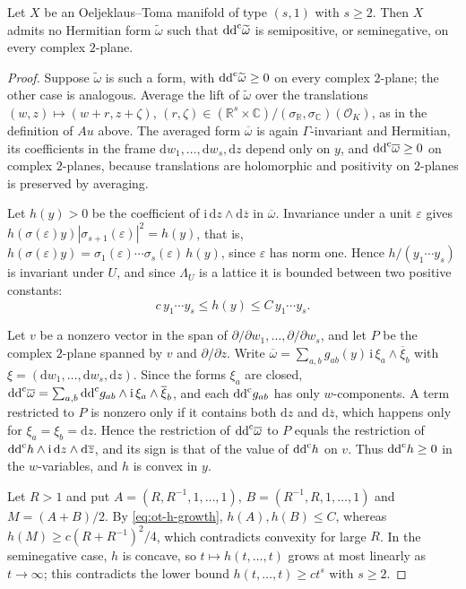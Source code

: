 \begin{proposition}\label{prop:ot-no-plurisigned}
Let $X$ be an Oeljeklaus--Toma manifold of type $(s,1)$ with $s\geq2$. Then $X$ admits no Hermitian form $\widetilde\omega$ such that $\mathrm{dd}^{\mathrm{c}}\widetilde\omega$ is semipositive, or seminegative, on every complex $2$-plane.
\end{proposition}
\begin{proof}
Suppose $\widetilde\omega$ is such a form, with $\mathrm{dd}^{\mathrm{c}}\widetilde\omega\geq0$ on every complex $2$-plane; the other case is analogous. Average the lift of $\widetilde\omega$ over the translations $(w,z)\mapsto(w+r,z+\zeta)$, $(r,\zeta)\in(\mathbb R^s\times\mathbb C)/(\sigma_{\mathbb R},\sigma_{\mathbb C})(\mathcal O_K)$, as in the definition of $Au$ above. The averaged form $\overline\omega$ is again $\Gamma$-invariant and Hermitian, its coefficients in the frame $\mathrm dw_1,\ldots,\mathrm dw_s,\mathrm dz$ depend only on $y$, and $\mathrm{dd}^{\mathrm{c}}\overline\omega\geq0$ on complex $2$-planes, because translations are holomorphic and positivity on $2$-planes is preserved by averaging.

Let $h(y)>0$ be the coefficient of $\mathrm i\,\mathrm dz\wedge\mathrm d\overline z$ in $\overline\omega$. Invariance under a unit $\varepsilon$ gives $h(\sigma(\varepsilon)y)|\sigma_{s+1}(\varepsilon)|^2=h(y)$, that is, $h(\sigma(\varepsilon)y)=\sigma_1(\varepsilon)\cdots\sigma_s(\varepsilon)\,h(y)$, since $\varepsilon$ has norm one. Hence $h/(y_1\cdots y_s)$ is invariant under $U$, and since $\Lambda_U$ is a lattice it is bounded between two positive constants:
\begin{equation}\label{eq:ot-h-growth}
 c\,y_1\cdots y_s\leq h(y)\leq C\,y_1\cdots y_s.
\end{equation}

Let $v$ be a nonzero vector in the span of $\partial/\partial w_1,\ldots,\partial/\partial w_s$, and let $P$ be the complex $2$-plane spanned by $v$ and $\partial/\partial z$. Write $\overline\omega=\sum_{a,b}g_{ab}(y)\,\mathrm i\,\xi_a\wedge\overline\xi_b$ with $\xi=(\mathrm dw_1,\ldots,\mathrm dw_s,\mathrm dz)$. Since the forms $\xi_a$ are closed, $\mathrm{dd}^{\mathrm{c}}\overline\omega=\sum_{a,b}\mathrm{dd}^{\mathrm{c}} g_{ab}\wedge\mathrm i\,\xi_a\wedge\overline\xi_b$, and each $\mathrm{dd}^{\mathrm{c}} g_{ab}$ has only $w$-components. A term restricted to $P$ is nonzero only if it contains both $\mathrm dz$ and $\mathrm d\overline z$, which happens only for $\xi_a=\xi_b=\mathrm dz$. Hence the restriction of $\mathrm{dd}^{\mathrm{c}}\overline\omega$ to $P$ equals the restriction of $\mathrm{dd}^{\mathrm{c}} h\wedge\mathrm i\,\mathrm dz\wedge\mathrm d\overline z$, and its sign is that of the value of $\mathrm{dd}^{\mathrm{c}} h$ on $v$. Thus $\mathrm{dd}^{\mathrm{c}} h\geq0$ in the $w$-variables, and $h$ is convex in $y$.

Let $R>1$ and put $A=(R,R^{-1},1,\ldots,1)$, $B=(R^{-1},R,1,\ldots,1)$ and $M=(A+B)/2$. By \eqref{eq:ot-h-growth}, $h(A),h(B)\leq C$, whereas $h(M)\geq c(R+R^{-1})^2/4$, which contradicts convexity for large $R$. In the seminegative case, $h$ is concave, so $t\mapsto h(t,\ldots,t)$ grows at most linearly as $t\to\infty$; this contradicts the lower bound $h(t,\ldots,t)\geq ct^s$ with $s\geq2$.
\end{proof}

